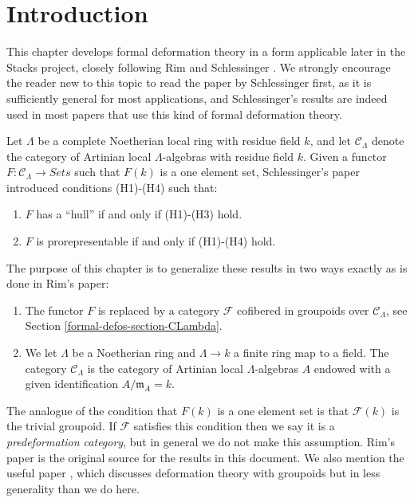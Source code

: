 \section{Introduction}
\label{formal-defos-section-introduction}
This chapter develops formal deformation theory in a form applicable
later in the Stacks project, closely following Rim \cite[Exposee VI]{SGA7-I}
and Schlessinger \cite{Sch}. We strongly encourage the reader new to
this topic to read the paper by Schlessinger first, as it is sufficiently
general for most applications, and Schlessinger's results are indeed
used in most papers that use this kind of formal deformation theory.

\medskip\noindent
Let $\Lambda$ be a complete Noetherian local ring with residue field $k$,
and let $\mathcal{C}_\Lambda$ denote the category of Artinian local
$\Lambda$-algebras with residue field $k$. Given a functor
$F : \mathcal{C}_\Lambda \to \textit{Sets}$ such that $F(k)$
is a one element set, Schlessinger's paper introduced conditions
(H1)-(H4) such that:
\begin{enumerate}
\item $F$ has a ``hull'' if and only if (H1)-(H3) hold.
\item $F$ is prorepresentable if and only if (H1)-(H4) hold.
\end{enumerate}
The purpose of this chapter is to generalize these results in two ways
exactly as is done in Rim's paper:
\begin{enumerate}
\item[(A)] The functor $F$ is replaced by a category $\mathcal{F}$ cofibered
in groupoids over $\mathcal{C}_\Lambda$, see
Section \ref{formal-defos-section-CLambda}.
\item[(B)] We let $\Lambda$ be a Noetherian ring and $\Lambda \to k$
a finite ring map to a field. The category $\mathcal{C}_\Lambda$ is
the category of Artinian local $\Lambda$-algebras $A$ endowed with a
given identification $A/\mathfrak m_A = k$.
\end{enumerate}
The analogue of the condition that $F(k)$ is a  one element set is that
$\mathcal{F}(k)$ is the trivial groupoid. If $\mathcal{F}$ satisfies this
condition then we say it is a {\it predeformation category}, but in  general
we do not make this assumption.  Rim's paper \cite[Exposee VI]{SGA7-I} is the
original source for the results in this document. We also mention the useful
paper \cite{Talpo-Vistoli}, which discusses deformation theory with groupoids
but in less generality than we do here.


